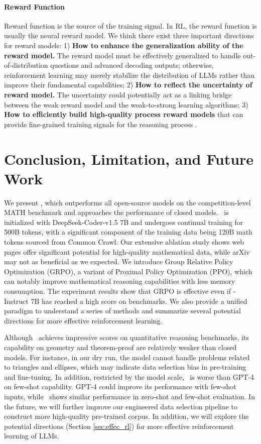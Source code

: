 \paragraph{Reward Function} Reward function is the source of the training signal.
In RL, the reward function is usually the neural reward model.
We think there exist three important directions for reward models:
1) \textbf{How to enhance the generalization ability of the reward model.} The reward model must be effectively generalized to handle out-of-distribution questions and advanced decoding outputs; otherwise, reinforcement learning may merely stabilize the distribution of LLMs rather than improve their fundamental capabilities;
2) \textbf{How to reflect the uncertainty of reward model.} The uncertainty could potentially act as a linking bridge between the weak reward model and the weak-to-strong learning algorithms;
3) \textbf{How to efficiently build high-quality process reward models} that can provide fine-grained training signals for the reasoning process \citep{lightman2023let,wang2023math}.




\section{Conclusion, Limitation, and Future Work}
We present \spmath, which outperforms all open-source models on the competition-level MATH benchmark and approaches the performance of closed models.
\spmath~is initialized with DeepSeek-Coder-v1.5 7B and undergoes continual training for 500B tokens, with a significant component of the training data being 120B math tokens sourced from Common Crawl.
Our extensive ablation study shows web pages offer significant potential for high-quality mathematical data, while arXiv may not as beneficial as we expected.
We introduce Group Relative Policy Optimization (GRPO), a variant of Proximal Policy Optimization (PPO), which can notably improve mathematical reasoning capabilities with less memory consumption.
The experiment results show that GRPO is effective even if \spmath-Instruct 7B has reached a high score on benchmarks. 
We also provide a unified paradigm to understand a series of methods and summarize several potential directions for more effective reinforcement learning.

Although \spmath~achieves impressive scores on quantitative reasoning benchmarks, its capability on geometry and theorem-proof are relatively weaker than closed models.
For instance, in our dry run, the model cannot handle problems related to triangles and ellipses, which may indicate data selection bias in pre-training and fine-tuning. In addition, restricted by the model scale, \spmath~is worse than GPT-4 on few-shot capability.
GPT-4 could improve its performance with few-shot inputs, while \spmath~shows similar performance in zero-shot and few-shot evaluation.
In the future, we will further improve our engineered data selection pipeline to construct more high-quality pre-trained corpus.
In addition, we will explore the potential directions (Section \ref{sec:effec_rl}) for more effective reinforcement learning of LLMs.

\newpage


